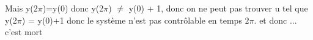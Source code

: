 \documentclass{article}
\begin{document}
    
    Mais y($2\pi$)=y(0) donc y(2$\pi$) $\neq$ y(0) + 1, donc on ne peut pas trouver u tel que y(2$\pi$) = y(0)+1 donc le système n'est pas contrôlable en temps $2\pi$.
    et donc ...
    c'est mort
\end{document}
